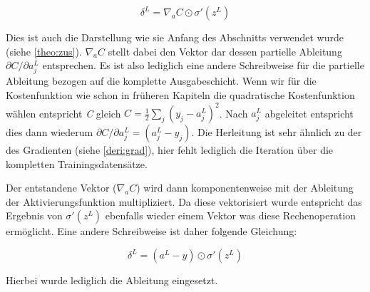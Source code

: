 \begin{equation}
\delta^L = \nabla_a C \odot \sigma'(z^L)
\end{equation}

Dies ist auch die Darstellung wie sie Anfang des Abschnitts verwendet wurde (siehe \ref{theo:zus}). $\nabla_a C$ stellt dabei den Vektor dar dessen partielle Ableitung $\partial C / \partial a^L_j$ entsprechen. Es ist also lediglich eine andere Schreibweise für die partielle Ableitung bezogen auf die komplette Ausgabeschicht. Wenn wir für die Kostenfunktion wie schon in früheren Kapiteln die quadratische Kostenfunktion wählen entspricht \emph{C} gleich $C = \frac{1}{2} \sum_j (y_j-a^L_j)^2$. Nach $a^L_j$ abgeleitet entspricht dies dann wiederum $\partial C / \partial a^L_j = (a_j^L-y_j)$. Die Herleitung ist sehr ähnlich zu der des Gradienten (siehe \ref{deri:grad}), hier fehlt lediglich die Iteration über die kompletten Trainingsdatensätze. 

Der entstandene Vektor ($\nabla_a C$) wird dann komponentenweise mit der Ableitung der Aktivierungsfunktion multipliziert. Da diese vektorisiert wurde entspricht das Ergebnis von $\sigma'(z^L)$ ebenfalls wieder einem Vektor was diese Rechenoperation ermöglicht. Eine andere Schreibweise ist daher folgende Gleichung: 

\begin{equation}
\delta^L = (a^L-y) \odot \sigma'(z^L)
\end{equation}

Hierbei wurde lediglich die Ableitung eingesetzt. 
